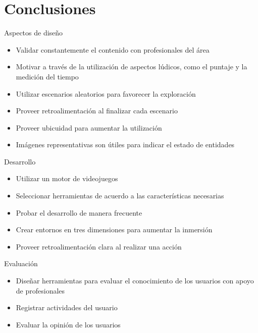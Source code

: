 \section{Conclusiones}
\setcounter{sectiontotal}{3}

\begin{frame}{Aspectos de diseño}
\begin{itemize}[<+->]
    \item Validar constantemente el contenido con profesionales del área
    \item Motivar a través de la utilización de aspectos lúdicos, como el
        puntaje y la medición del tiempo
    \item Utilizar escenarios aleatorios para favorecer la exploración
    \item Proveer retroalimentación al finalizar cada escenario
    \item Proveer ubicuidad para aumentar la utilización
    \item Imágenes representativas son útiles para indicar el estado de
        entidades
\end{itemize}
\end{frame}
\begin{frame}{Desarrollo}
\begin{itemize}[<+->]
    \item Utilizar un motor de videojuegos
    \item Seleccionar herramientas de acuerdo a las características necesarias
    \item Probar el desarrollo de manera frecuente
    \item Crear entornos en tres dimensiones para aumentar la inmersión
    \item Proveer retroalimentación clara al realizar una acción
\end{itemize}
\end{frame}
\begin{frame}{Evaluación}
\begin{itemize}[<+->]
    \item Diseñar herramientas para evaluar el conocimiento de los usuarios con
        apoyo de profesionales
    \item Registrar actividades del usuario
    \item Evaluar la opinión de los usuarios
\end{itemize}
\end{frame}

